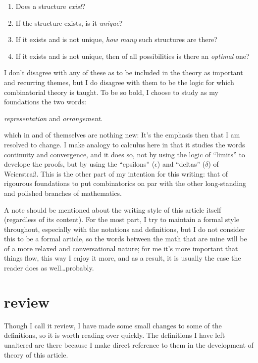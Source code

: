 \documentclass[twoside]{article}
\begin{document}
\begin{enumerate}

\item Does a structure \emph{exist}?

\item If the structure exists, is it \emph{unique}?

\item If it exists and is not unique, \emph{how many} such structures are there?

\item If it exists and is not unique, then of all possibilities is there an \emph{optimal} one?

\end{enumerate}

I don't disagree with any of these as to be included in the theory as important and
recurring themes, but I do disagree with them to be the logic for which combinatorial
theory is taught.  To be so bold, I choose to study as my foundations the two words:

\begin{center}
\emph{representation} and \emph{arrangement}.
\end{center}
which in and of themselves are nothing new:  It's the emphasis then that I am resolved to change.  I make analogy
to calculus here in that it studies the words continuity and convergence, and it does so, not by using the logic
of ``limits'' to develope the proofs, but by using the ``epsilons'' ($ \epsilon $) and ``deltas'' ($ \delta $) of
Weierstra\ss.  This is the other part of my intention for this writing:  that of rigourous foundations to
put combinatorics on par with the other long-standing and polished branches of mathematics.

A note should be mentioned about the writing style of this article itself (regardless of its content).
For the most part, I try to maintain a formal style throughout, especially with the notations and definitions,
but I do not consider this to be a formal article, so the words between the math that are mine will be of a more
relaxed and conversational nature; for me it's more important that things flow, this way I enjoy it more, and as
a result, it is usually the case the reader does as well\ldots probably.

\section{review}

Though I call it review, I have made some small changes to some of the definitions, so it is worth reading over
quickly.  The definitions I have left unaltered are there because I make direct reference to them in the development
of theory of this article.
\end{document}
